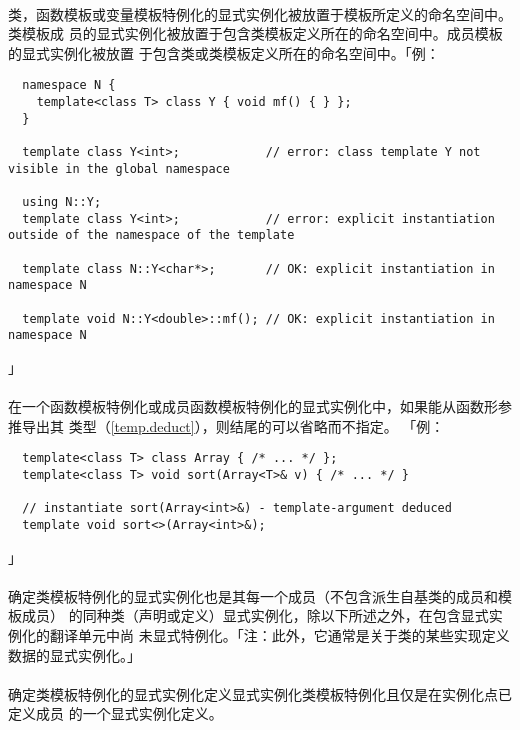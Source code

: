 \paragraph{}
类，函数模板或变量模板特例化的显式实例化被放置于模板所定义的命名空间中。类模板成
员的显式实例化被放置于包含类模板定义所在的命名空间中。成员模板的显式实例化被放置
于包含类或类模板定义所在的命名空间中。「例：
\begin{lstlisting}
  namespace N {
    template<class T> class Y { void mf() { } };
  }

  template class Y<int>;            // error: class template Y not visible in the global namespace

  using N::Y;
  template class Y<int>;            // error: explicit instantiation outside of the namespace of the template

  template class N::Y<char*>;       // OK: explicit instantiation in namespace N

  template void N::Y<double>::mf(); // OK: explicit instantiation in namespace N
\end{lstlisting}」

\paragraph{}
在一个函数模板特例化或成员函数模板特例化的显式实例化中，如果能从函数形参推导出其
类型（\ref{temp.deduct}），则结尾的可以省略而不指定。
「例：
\begin{lstlisting}
  template<class T> class Array { /* ... */ };
  template<class T> void sort(Array<T>& v) { /* ... */ }

  // instantiate sort(Array<int>&) - template-argument deduced
  template void sort<>(Array<int>&);
\end{lstlisting}」

\paragraph{}
确定类模板特例化的显式实例化也是其每一个成员（不包含派生自基类的成员和模板成员）
的同种类（声明或定义）显式实例化，除以下所述之外，在包含显式实例化的翻译单元中尚
未显式特例化。「注：此外，它通常是关于类的某些实现定义数据的显式实例化。」

\paragraph{}
确定类模板特例化的显式实例化定义显式实例化类模板特例化且仅是在实例化点已定义成员
的一个显式实例化定义。

